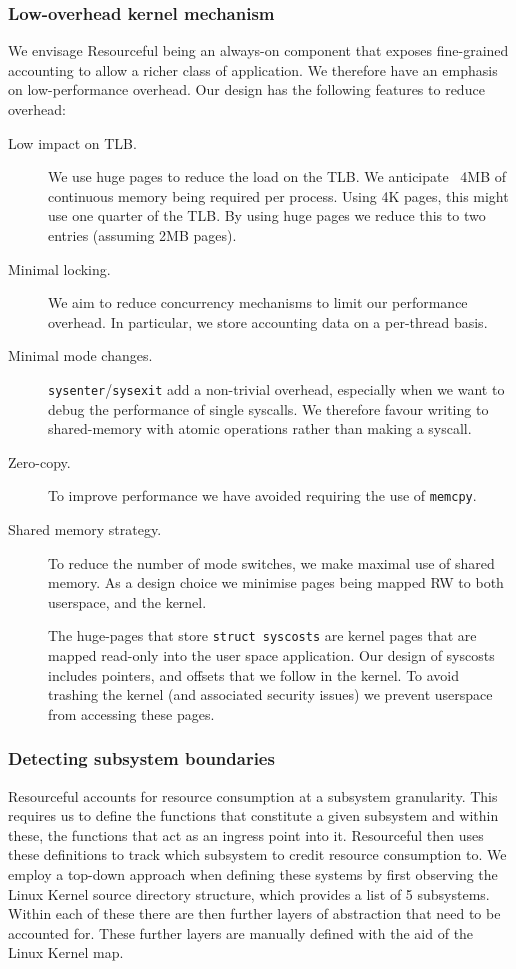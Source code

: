 \documentclass[12pt]{article}
\def\_{\textunderscore\-}
\begin{document}
  \subsubsection{Low-overhead kernel mechanism}
  We envisage Resourceful being an always-on component that exposes fine-grained accounting to allow a richer class of application. We therefore have an emphasis on low-performance overhead. Our design has the following features to reduce overhead:
  \begin{description}
  \item[Low impact on TLB.] We use huge pages to reduce the load on the TLB.
  We anticipate ~4MB of continuous memory being required per process. Using 4K pages, this might use one quarter of the TLB. By using huge pages we reduce this to two entries (assuming 2MB pages).

  \item[Minimal locking.] We aim to reduce concurrency mechanisms to limit our performance overhead. In particular, we store accounting data on a per-thread basis.

  \item[Minimal mode changes.] \texttt{sysenter}/\texttt{sysexit}  add a non-trivial overhead, especially when we want to debug the performance of single syscalls. We therefore favour writing to shared-memory with atomic operations rather than making a syscall.

  \item[Zero-copy.] To improve performance we have avoided requiring the use of \texttt{memcpy}.

  \item[Shared memory strategy.] To reduce the number of mode switches, we make maximal use of shared memory. As a design choice we minimise pages being mapped RW to both userspace, and the kernel.

  The huge-pages that store \texttt{struct sys\_costs} are kernel pages that are mapped read-only into the user space application. Our design of sys\_costs includes pointers, and offsets that we follow in the kernel. To avoid trashing the kernel (and associated security issues) we prevent userspace from accessing these pages.

  \end{description}

  \subsubsection{Detecting subsystem boundaries}
  Resourceful accounts for resource consumption at a subsystem granularity.
  This requires us to define the functions that constitute a given subsystem and within these, the functions that act as an ingress point into it.
  Resourceful then uses these definitions to track which subsystem to credit resource consumption to.
  We employ a top-down approach when defining these systems by first observing the Linux Kernel source directory structure, which provides a list of 5 subsystems. Within each of these there are then further layers of abstraction that need to be accounted for. These further layers are manually defined with the aid of the Linux Kernel map.
\end{document}
